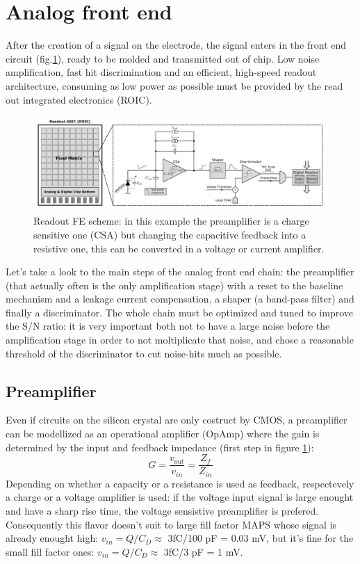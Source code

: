 \section{Analog front end}
   After the creation of a signal on the electrode, the signal enters in the front end circuit (fig.\ref{fig:readout_scheme}), ready to be molded and transmitted out of chip.
   Low noise amplification, fast hit discrimination and an efficient, high-speed readout architecture, consuming as low power as possible  must be provided by the read out integrated electronics (ROIC).\\
   \begin{figure}
      \centering
      \includegraphics[width=1.\linewidth]{figures/Pixel_detectors/readout_scheme.png}
      \caption{Readout FE scheme: in this example the preamplifier is a charge sensitive one (CSA) but changing the capacitive feedback into a resistive one, this can be converted in a voltage or current amplifier.}
      \label{fig:readout_scheme}
   \end{figure}
   Let's take a look to the main steps of the analog front end chain: the preamplifier (that actually often is the only amplification stage) with a reset to the baseline mechanism and a leakage current compensation, a shaper (a band-pass filter) and finally a discriminator. The whole chain must be optimized and tuned to improve the S/N ratio: it is very important both not to have a large noise before the amplification stage in order to not moltiplicate that noise, and chose a reasonable threshold of the discriminator to cut noise-hits much as possible.

   \subsection{Preamplifier}\label{subsec:preamplifier}
      Even if circuits on the silicon crystal are only costruct by CMOS, a preamplifier can be modellized as an operational amplifier (OpAmp) where the gain is determined by the input and feedback impedance (first step in figure \ref{fig:readout_scheme}):
      \begin{equation}
         G = \frac{v_{out}}{v_{in}} = \frac{Z_{f}}{Z_{in}}
      \end{equation}
      Depending on whether a capacity or a resistance is used as feedback, respectevely a charge or a voltage amplifier is used: if the voltage input signal is large enought and have a sharp rise time, the voltage sensistive preamplifier is prefered. Consequently this flavor doesn't suit to large fill factor MAPS whose signal is already enought high: $v_{in} = Q/C_{D} \approx$ 3fC/100 pF = 0.03 mV, but it's fine for the small fill factor ones: $v_{in} = Q/C_{D} \approx$ 3fC/3 pF = 1 mV.

